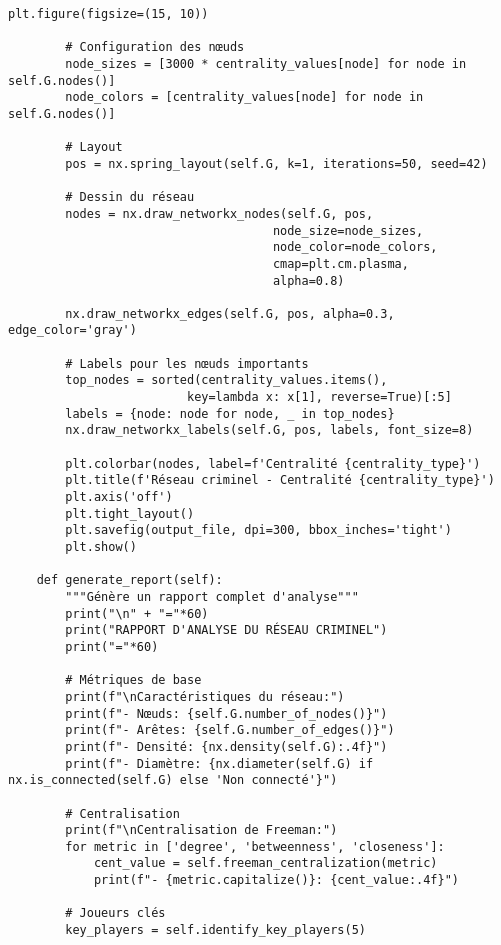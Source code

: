 \documentclass[12pt,a4paper]{article}
\begin{document}
\begin{lstlisting}[caption=Analyse de réseau criminel avec NetworkX]
        plt.figure(figsize=(15, 10))
        
        # Configuration des nœuds
        node_sizes = [3000 * centrality_values[node] for node in self.G.nodes()]
        node_colors = [centrality_values[node] for node in self.G.nodes()]
        
        # Layout
        pos = nx.spring_layout(self.G, k=1, iterations=50, seed=42)
        
        # Dessin du réseau
        nodes = nx.draw_networkx_nodes(self.G, pos,
                                     node_size=node_sizes,
                                     node_color=node_colors,
                                     cmap=plt.cm.plasma,
                                     alpha=0.8)
        
        nx.draw_networkx_edges(self.G, pos, alpha=0.3, edge_color='gray')
        
        # Labels pour les nœuds importants
        top_nodes = sorted(centrality_values.items(), 
                         key=lambda x: x[1], reverse=True)[:5]
        labels = {node: node for node, _ in top_nodes}
        nx.draw_networkx_labels(self.G, pos, labels, font_size=8)
        
        plt.colorbar(nodes, label=f'Centralité {centrality_type}')
        plt.title(f'Réseau criminel - Centralité {centrality_type}')
        plt.axis('off')
        plt.tight_layout()
        plt.savefig(output_file, dpi=300, bbox_inches='tight')
        plt.show()
    
    def generate_report(self):
        """Génère un rapport complet d'analyse"""
        print("\n" + "="*60)
        print("RAPPORT D'ANALYSE DU RÉSEAU CRIMINEL")
        print("="*60)
        
        # Métriques de base
        print(f"\nCaractéristiques du réseau:")
        print(f"- Nœuds: {self.G.number_of_nodes()}")
        print(f"- Arêtes: {self.G.number_of_edges()}")
        print(f"- Densité: {nx.density(self.G):.4f}")
        print(f"- Diamètre: {nx.diameter(self.G) if nx.is_connected(self.G) else 'Non connecté'}")
        
        # Centralisation
        print(f"\nCentralisation de Freeman:")
        for metric in ['degree', 'betweenness', 'closeness']:
            cent_value = self.freeman_centralization(metric)
            print(f"- {metric.capitalize()}: {cent_value:.4f}")
        
        # Joueurs clés
        key_players = self.identify_key_players(5)
        

\end{lstlisting}
\end{document}
